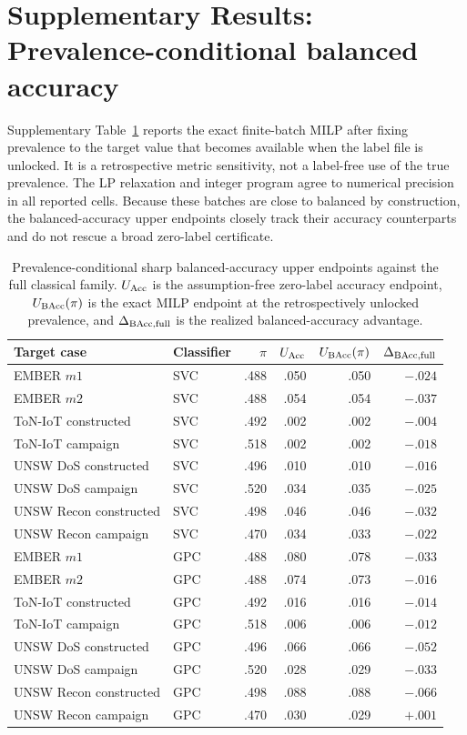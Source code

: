 \documentclass[11pt]{article}
\begin{document}
\section*{Supplementary Results: Prevalence-conditional balanced accuracy}
\label{supp:v9_bacc}

Supplementary Table~\ref{supp:tab_v9_bacc} reports the exact finite-batch
MILP after fixing prevalence to the target value that becomes available when
the label file is unlocked. It is a retrospective metric sensitivity, not a
label-free use of the true prevalence. The LP relaxation and integer program
agree to numerical precision in all reported cells. Because these batches
are close to balanced by construction, the balanced-accuracy upper endpoints
closely track their accuracy counterparts and do not rescue a broad
zero-label certificate.

\begin{table}[htbp]
\centering
\caption{Prevalence-conditional sharp balanced-accuracy upper endpoints
against the full classical family. $U_{\rm Acc}$ is the assumption-free
zero-label accuracy endpoint, $U_{\rm BAcc}(\pi)$ is the exact MILP endpoint
at the retrospectively unlocked prevalence, and
$\Delta_{\rm BAcc,full}$ is the realized balanced-accuracy advantage.}
\label{supp:tab_v9_bacc}
\scriptsize
\setlength{\tabcolsep}{4pt}
\begin{tabular}{llrrrr}
\toprule
Target case & Classifier & $\pi$ & $U_{\rm Acc}$ & $U_{\rm BAcc}(\pi)$ &
$\Delta_{\rm BAcc,full}$\\
\midrule
EMBER $m1$ & SVC & .488 & .050 & .050 & $-.024$\\
EMBER $m2$ & SVC & .488 & .054 & .054 & $-.037$\\
ToN-IoT constructed & SVC & .492 & .002 & .002 & $-.004$\\
ToN-IoT campaign & SVC & .518 & .002 & .002 & $-.018$\\
UNSW DoS constructed & SVC & .496 & .010 & .010 & $-.016$\\
UNSW DoS campaign & SVC & .520 & .034 & .035 & $-.025$\\
UNSW Recon constructed & SVC & .498 & .046 & .046 & $-.032$\\
UNSW Recon campaign & SVC & .470 & .034 & .033 & $-.022$\\
\addlinespace
EMBER $m1$ & GPC & .488 & .080 & .078 & $-.033$\\
EMBER $m2$ & GPC & .488 & .074 & .073 & $-.016$\\
ToN-IoT constructed & GPC & .492 & .016 & .016 & $-.014$\\
ToN-IoT campaign & GPC & .518 & .006 & .006 & $-.012$\\
UNSW DoS constructed & GPC & .496 & .066 & .066 & $-.052$\\
UNSW DoS campaign & GPC & .520 & .028 & .029 & $-.033$\\
UNSW Recon constructed & GPC & .498 & .088 & .088 & $-.066$\\
UNSW Recon campaign & GPC & .470 & .030 & .029 & $+.001$\\
\bottomrule
\end{tabular}
\end{table}
\end{document}
